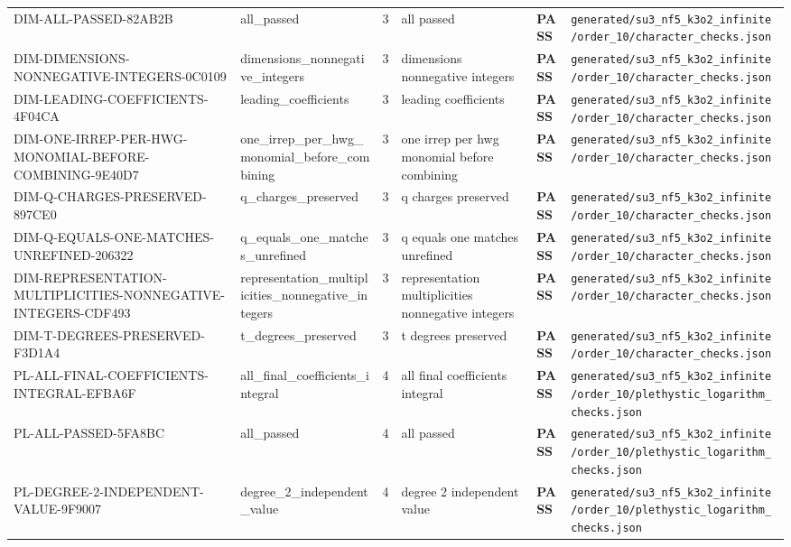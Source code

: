 \documentclass[11pt]{article}
\newcommand{\Pass}{\textcolor{green!50!black}{\textbf{PASS}}}
\newcommand{\RawPath}[1]{\texttt{#1}}
\begin{document}
\begin{longtable}{p{3cm}p{2.5cm}r p{3cm}l p{2cm}}
DIM-ALL-PASSED-82AB2B & all\_passed & 3 & all passed & \Pass & \RawPath{generated/su3\_nf5\_k3o2\_infinite/order\_10/character\_checks.json}\\
DIM-DIMENSIONS-NONNEGATIVE-INTEGERS-0C0109 & dimensions\_nonnegative\_integers & 3 & dimensions nonnegative integers & \Pass & \RawPath{generated/su3\_nf5\_k3o2\_infinite/order\_10/character\_checks.json}\\
DIM-LEADING-COEFFICIENTS-4F04CA & leading\_coefficients & 3 & leading coefficients & \Pass & \RawPath{generated/su3\_nf5\_k3o2\_infinite/order\_10/character\_checks.json}\\
DIM-ONE-IRREP-PER-HWG-MONOMIAL-BEFORE-COMBINING-9E40D7 & one\_irrep\_per\_hwg\_monomial\_before\_combining & 3 & one irrep per hwg monomial before combining & \Pass & \RawPath{generated/su3\_nf5\_k3o2\_infinite/order\_10/character\_checks.json}\\
DIM-Q-CHARGES-PRESERVED-897CE0 & q\_charges\_preserved & 3 & q charges preserved & \Pass & \RawPath{generated/su3\_nf5\_k3o2\_infinite/order\_10/character\_checks.json}\\
DIM-Q-EQUALS-ONE-MATCHES-UNREFINED-206322 & q\_equals\_one\_matches\_unrefined & 3 & q equals one matches unrefined & \Pass & \RawPath{generated/su3\_nf5\_k3o2\_infinite/order\_10/character\_checks.json}\\
DIM-REPRESENTATION-MULTIPLICITIES-NONNEGATIVE-INTEGERS-CDF493 & representation\_multiplicities\_nonnegative\_integers & 3 & representation multiplicities nonnegative integers & \Pass & \RawPath{generated/su3\_nf5\_k3o2\_infinite/order\_10/character\_checks.json}\\
DIM-T-DEGREES-PRESERVED-F3D1A4 & t\_degrees\_preserved & 3 & t degrees preserved & \Pass & \RawPath{generated/su3\_nf5\_k3o2\_infinite/order\_10/character\_checks.json}\\
PL-ALL-FINAL-COEFFICIENTS-INTEGRAL-EFBA6F & all\_final\_coefficients\_integral & 4 & all final coefficients integral & \Pass & \RawPath{generated/su3\_nf5\_k3o2\_infinite/order\_10/plethystic\_logarithm\_checks.json}\\
PL-ALL-PASSED-5FA8BC & all\_passed & 4 & all passed & \Pass & \RawPath{generated/su3\_nf5\_k3o2\_infinite/order\_10/plethystic\_logarithm\_checks.json}\\
PL-DEGREE-2-INDEPENDENT-VALUE-9F9007 & degree\_2\_independent\_value & 4 & degree 2 independent value & \Pass & \RawPath{generated/su3\_nf5\_k3o2\_infinite/order\_10/plethystic\_logarithm\_checks.json}\\

\end{longtable}
\end{document}
